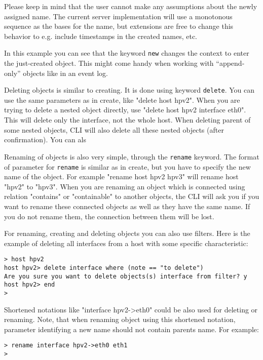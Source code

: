 \documentclass[deska]{subfiles}
\begin{document}
Please keep in mind that the user cannot make any assumptions about the newly assigned name.  The current server
implementation will use a monotonous sequence as the bases for the name, but extensions are free to change this behavior
to e.g. include timestamps in the created names, etc.

In this example you can see that the keyword {\tt new} changes the context to enter the just-created object.  This might
come handy when working with ``append-only'' objects like in an event log.

Deleting objects is similar to creating. It is done using keyword {\tt delete}. You can use the same parameters as in
create, like "delete host hpv2". When you are trying to delete a nested object directly, use "delete host hpv2 interface
eth0". This will delete only the interface, not the whole host. When deleting parent of some nested objects, CLI will
also delete all these nested objects (after confirmation). You can als

Renaming of objects is also very simple, through the {\tt rename} keyword. The format of
parameter for {\tt rename} is similar as in create, but you have to specify the new name of the object. For example
"rename host hpv2 hpv3" will rename host "hpv2" to "hpv3". When you are renaming an object which is connected using relation
"contains" or "containable" to another objects, the CLI will ask you if you want to rename these connected objects
as well as they have the same name. If you do not rename them, the connection between them will be lost.

For renaming, creating and deleting objects you can also use filters. Here is the example of deleting all interfaces from
a host with some specific characteristic:

\begin{verbatim}
> host hpv2
host hpv2> delete interface where (note == "to delete")
Are you sure you want to delete objects(s) interface from filter? y
host hpv2> end
>
\end{verbatim}

Shortened notations like "interface hpv2->eth0" could be also used for deleting or renaming. Note, that when renaming
object using this shortened notation, parameter identifying a new name should not contain parents name. For example:

\begin{verbatim}
> rename interface hpv2->eth0 eth1
>
\end{verbatim}
\end{document}
